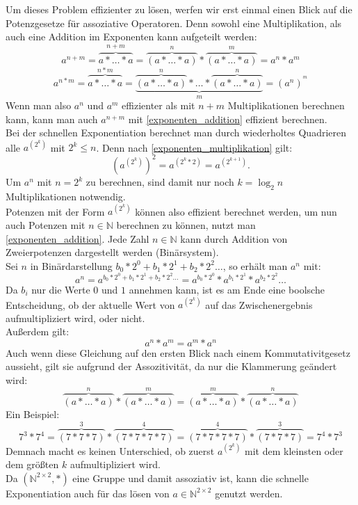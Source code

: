 \documentclass[course=erap]{aspdoc}
\begin{document}
Um dieses Problem effizienter zu lösen, werfen wir erst einmal einen Blick auf die Potenzgesetze für assoziative Operatoren. Denn sowohl eine Multiplikation, als auch eine Addition im Exponenten kann aufgeteilt werden:
\begin{equation}\label{exponenten_addition}
    a^{n+m} = \overbrace{a*\dots*a}^{n+m} = \overbrace{(a*\dots*a)}^n * \overbrace{(a*\dots*a)}^m = a^n * a^m
\end{equation}
\begin{equation}\label{exponenten_multiplikation}
    a^{n*m} = \overbrace{a*\dots*a}^{n*m} = \underbrace{\overbrace{(a*\dots*a)}^n*\dots*\overbrace{(a*\dots*a)}^n}_m = (a^n)^{^m}
\end{equation}
Wenn man also $a^n$ und $a^m$ effizienter als mit $n+m$ Multiplikationen berechnen kann, kann man auch $a^{n+m}$ mit \ref{exponenten_addition} effizient berechnen.\\
Bei der schnellen Exponentiation berechnet man durch wiederholtes Quadrieren alle $a^{(2^k)}$ mit $2^k \le n$. Denn nach \ref{exponenten_multiplikation} gilt:
\[ {\left( a^{(2^k)} \right)}^2 = a^{(2^k*2)} = a^{(2^{k+1})}.\]
Um $a^n$ mit $n=2^k$ zu berechnen, sind damit nur noch $k=\log_2n$ Multiplikationen notwendig.
\\Potenzen mit der Form $a^{(2^k)}$ können also effizient berechnet werden, um nun auch Potenzen mit $n\in\mathbb{N}$ berechnen zu können, nutzt man \ref{exponenten_addition}. 
Jede Zahl $n\in\mathbb{N}$ kann durch Addition von Zweierpotenzen dargestellt werden (Binärsystem). \\
Sei $n$ in Binärdarstellung $b_0*2^0+b_1*2^1+b_2*2^2\dots$, so erhält man $a^n$ mit:
\[ a^n = a^{b_0*2^0+b_1*2^1+b_2*2^2\dots} = a^{b_0*2^0} * a^{b_1*2^1} * a^{b_2*2^2} \dots \]
Da $b_i$ nur die Werte $0$ und $1$ annehmen kann, ist es am Ende eine boolsche Entscheidung, ob der aktuelle Wert von $a^{(2^k)}$ auf das Zwischenergebnis aufmultipliziert wird, oder nicht.\\
Außerdem gilt:
\begin{equation}\label{swap_exponents}
      a^n*a^m = a^m*a^n
\end{equation}
Auch wenn diese Gleichung auf den ersten Blick nach einem Kommutativitgesetz aussieht, gilt sie aufgrund der Assozitivität, da nur die Klammerung geändert wird:
\[ \overbrace{(a*\dots*a)}^n*\overbrace{(a*\dots*a)}^m = \overbrace{(a*\dots*a)}^m*\overbrace{(a*\dots*a)}^n \]
Ein Beispiel:
\[ 7^3*7^4 = \overbrace{(7*7*7)}^3*\overbrace{(7*7*7*7)}^4 = \overbrace{(7*7*7*7)}^4*\overbrace{(7*7*7)}^3 = 7^4*7^3 \]
Demnach macht es keinen Unterschied, ob zuerst $a^{(2^k)}$ mit dem kleinsten oder dem größten $k$ aufmultipliziert wird.\\
Da $(\mathbb{N}^{2\times 2}, *)$ eine Gruppe und damit assoziativ ist, kann die schnelle Exponentiation auch für das lösen von $a\in\mathbb{N}^{2\times 2}$ genutzt werden.
\end{document}

